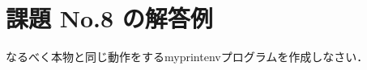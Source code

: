 \documentclass[a4j,twcolumn,11pt,nomag]{ltjarticle}      %
\begin{document}
\onecolumn

\section*{課題 No.8 の解答例}
なるべく本物と同じ動作をするmyprintenvプログラムを作成しなさい．
\end{document}
